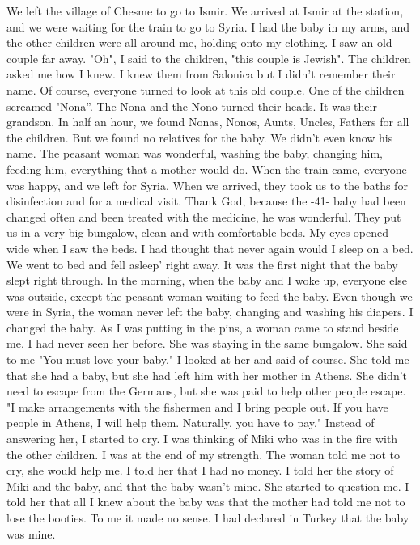 We left the village of Chesme to go to Ismir.
We arrived at Ismir at the station, and we were waiting for the train to go to Syria.
I had the baby in my arms, and the other children were all around me, holding onto my clothing.
I saw an old couple far away.
"Oh", I said to the children, "this couple is Jewish".
The children asked me how I knew.
I 
knew them from Salonica but I didn't remember their name.
Of course, everyone turned to look at this old couple.
One of the children screamed "Nona”.
The Nona and the Nono turned their heads.
It was their grandson.
In half an hour, we found Nonas, Nonos, Aunts, Uncles, Fathers for all the children.
But we found no relatives for the baby.
We didn't even know his name.
The peasant woman was wonderful, washing the baby, changing him, feeding him, everything that a mother would do.
When the train came, everyone 
was happy, and we left for Syria.
When we arrived, they took us to the 
baths for disinfection and for a medical visit.
Thank God, because the 
-41- 
baby had been changed often and been treated with the medicine, he was 
wonderful.
They put us in a very big bungalow, clean and with comfortable 
beds.
My eyes opened wide when I saw the beds.
I had thought that never 
again would I sleep on a bed.
We went to bed and fell asleep' right away.
It was the first night that the baby slept right through.
In the morning, when the baby and I woke up, everyone else was outside, except the peasant woman waiting to feed the baby.
Even though we were in Syria, the woman never left the baby, changing and washing his diapers.
I changed the baby.
As I was putting in the pins, a woman came to 
stand beside me.
I had never seen her before.
She was staying in the same bungalow.
She said to me "You must love your baby."
I looked at her and said of course.
She told me that she had a baby, but she had left him with her mother in Athens.
She didn't need to escape from the Germans, but she was paid to help other people escape.
"I make arrangements with the 
fishermen and I bring people out.
If you have people in Athens, I will help them.
Naturally, you have to pay."
Instead of answering her, I started to cry.
I was thinking of Miki who was in the fire with the other children.
I was at the end of my strength.
The woman told me not to cry, she would help me.
I told her that I had no money.
I told her the story of Miki and the baby, and that the baby wasn't mine.
She started to question me.
I told her that all I knew about the baby was that the mother had told me not to lose the booties.
To me it made no sense.
I had declared in Turkey that the baby was mine.
